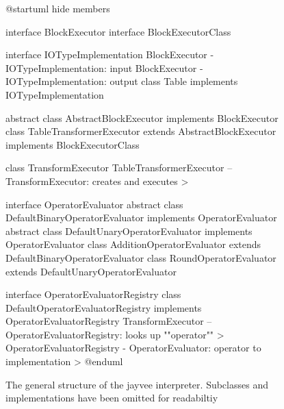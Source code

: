 \begin{figure}
	\begin{plantuml}
		@startuml
		hide members

		interface BlockExecutor
		interface BlockExecutorClass

		interface IOTypeImplementation
		BlockExecutor  -  IOTypeImplementation: input
		BlockExecutor - IOTypeImplementation: output
		class Table implements IOTypeImplementation

		abstract class AbstractBlockExecutor implements BlockExecutor
		class TableTransformerExecutor extends AbstractBlockExecutor implements BlockExecutorClass

		class TransformExecutor
		TableTransformerExecutor -- TransformExecutor: creates and executes >

		interface OperatorEvaluator
		abstract class DefaultBinaryOperatorEvaluator implements OperatorEvaluator
		abstract class DefaultUnaryOperatorEvaluator implements OperatorEvaluator
		class AdditionOperatorEvaluator extends DefaultBinaryOperatorEvaluator
		class RoundOperatorEvaluator extends DefaultUnaryOperatorEvaluator

		interface OperatorEvaluatorRegistry
		class DefaultOperatorEvaluatorRegistry implements OperatorEvaluatorRegistry
		TransformExecutor -- OperatorEvaluatorRegistry: looks up ""operator"" >
		OperatorEvaluatorRegistry - OperatorEvaluator: operator to implementation >
		@enduml
	\end{plantuml}
	\caption{The general structure of the jayvee interpreter. Subclasses and implementations have been omitted for readabiltiy}
	\label{fig:uml:overview}
\end{figure}


